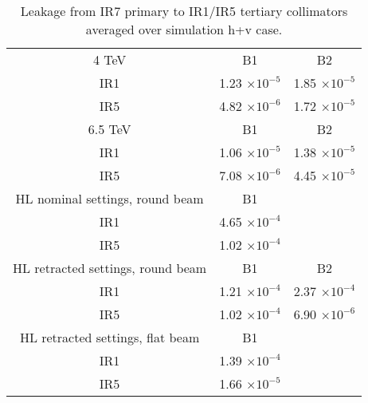 \begin{table}%
   \centering
   \caption{Leakage from IR7 primary to IR1/IR5 tertiary collimators averaged over simulation h+v case.}

   \begin{tabular}{c|c|c}
       \hline
       4 TeV  & B1 & B2\\

       IR1 & 1.23 $\times 10^{-5}$ & 1.85 $\times 10^{-5}$  \\
       IR5 & 4.82 $\times 10^{-6}$ & 1.72 $\times 10^{-5}$  \\
       \hline
       6.5 TeV  & B1 & B2\\

       IR1 & 1.06 $\times 10^{-5}$ & 1.38 $\times 10^{-5}$  \\
       IR5 & 7.08 $\times 10^{-6}$ & 4.45 $\times 10^{-5}$  \\
       \hline       
       HL nominal settings, round beam  & B1 & \\ %
       
       IR1 & 4.65 $\times 10^{-4}$ &  \\ 
       IR5 & 1.02 $\times 10^{-4}$ &  \\ %
       \hline
       HL retracted settings, round beam  & B1 & B2 \\
       
       IR1 & 1.21 $\times 10^{-4}$ &  2.37 $\times 10^{-4}$ \\ %
       IR5 & 1.02 $\times 10^{-4}$ &  6.90 $\times 10^{-6}$ \\ %
       \hline

       HL retracted settings, flat beam  & B1 \\       
       IR1 & 1.39 $\times 10^{-4}$ & \\ %
       IR5 & 1.66 $\times 10^{-5}$ & \\ %
       \hline
   \end{tabular}
   \label{leakageFactors4TeV}
\end{table}

